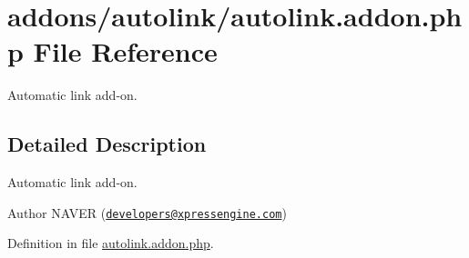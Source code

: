 \hypertarget{autolink_8addon_8php}{\section{addons/autolink/autolink.addon.\+php File Reference}
\label{autolink_8addon_8php}
}


Automatic link add-\/on.  




\subsection{Detailed Description}
Automatic link add-\/on. 

\begin{DoxyAuthor}{Author}
N\+A\+V\+E\+R (\href{mailto:developers@xpressengine.com}{\tt developers@xpressengine.\+com}) 
\end{DoxyAuthor}


Definition in file \hyperlink{autolink_8addon_8php_source}{autolink.\+addon.\+php}.

